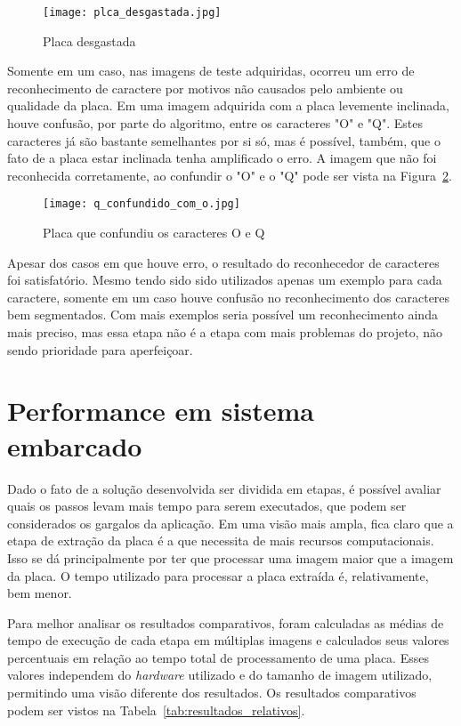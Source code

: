\begin{figure}[H]
	\centering
	\texttt{[image: plca\_desgastada.jpg]}
	\caption{Placa desgastada}
	\label{fig:placa_desgastada}
\end{figure}

Somente em um caso, nas imagens de teste adquiridas, ocorreu um erro de reconhecimento de caractere por motivos não causados pelo ambiente ou qualidade da placa. Em uma imagem adquirida com a placa levemente inclinada, houve confusão, por parte do algoritmo, entre os caracteres "O" e "Q". Estes caracteres já são bastante semelhantes por si só, mas é possível, também, que o fato de a placa estar inclinada tenha amplificado o erro. A imagem que não foi reconhecida corretamente, ao confundir o "O" e o "Q" pode ser vista na Figura~\ref{fig:q_confundido_com_o}.

\begin{figure}[H]
	\centering
	\texttt{[image: q\_confundido\_com\_o.jpg]}
	\caption{Placa que confundiu os caracteres O e Q}
	\label{fig:q_confundido_com_o}
\end{figure}

Apesar dos casos em que houve erro, o resultado do reconhecedor de caracteres foi satisfatório. Mesmo tendo sido sido utilizados apenas um exemplo para cada caractere, somente em um caso houve confusão no reconhecimento dos caracteres bem segmentados. Com mais exemplos seria possível um reconhecimento ainda mais preciso, mas essa etapa não é a etapa com mais problemas do projeto, não sendo prioridade para aperfeiçoar.

\section{Performance em sistema embarcado}
\label{sec:performance_resultados}

Dado o fato de a solução desenvolvida ser dividida em etapas, é possível avaliar
quais os passos levam mais tempo para serem executados, que podem ser
considerados os gargalos da aplicação. Em uma visão mais ampla, fica claro que a
etapa de extração da placa é a que necessita de mais recursos computacionais.
Isso se dá principalmente por ter que processar uma imagem maior que a imagem da
placa. O tempo utilizado para processar a placa extraída é, relativamente, bem
menor.

Para melhor analisar os resultados comparativos, foram calculadas as médias de
tempo de execução de cada etapa em múltiplas imagens e calculados seus valores
percentuais em relação ao tempo total de processamento de uma placa. Esses
valores independem do \emph{hardware} utilizado e do tamanho de imagem
utilizado, permitindo uma visão diferente dos resultados. Os resultados
comparativos podem ser vistos na Tabela~\ref{tab:resultados_relativos}.

